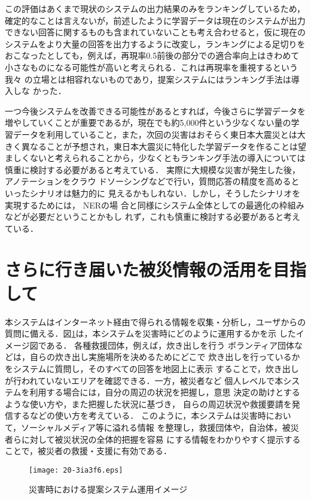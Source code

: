 \documentclass[japanese]{jnlp_1.4}
\begin{document}
この評価はあくまで現状のシステムの出力結果のみをランキングしているため，
確定的なことは言えないが，前述したように学習データは現在のシステムが出力
できない回答に関するものも含まれていないことも考え合わせると，仮に現在の
システムをより大量の回答を出力するように改変し，ランキングによる足切りを
おこなったとしても，例えば，再現率0.5前後の部分での適合率向上はきわめて
小さなものになる可能性が高いと考えられる．これは再現率を重視するという我々
の立場とは相容れないものであり，提案システムにはランキング手法は導入しな
かった．

一つ今後システムを改善できる可能性があるとすれば，今後さらに学習データを
増やしていくことが重要であるが，現在でも約5,000件という少なくない量の学
習データを利用していること，また，次回の災害はおそらく東日本大震災とは大
きく異なることが予想され，東日本大震災に特化した学習データを作ることは望
ましくないと考えられることから，少なくともランキング手法の導入については
慎重に検討する必要があると考えている．
実際に大規模な災害が発生した後，アノテーションをクラウ
ドソーシングなどで行い，質問応答の精度を高めるといったシナリオは魅力的に
見えるかもしれない．しかし，そうしたシナリオを実現するためには， NERの場
合と同様にシステム全体としての最適化の枠組みなどが必要だということかもし
れず，これも慎重に検討する必要があると考えている．


\section{さらに行き届いた被災情報の活用を目指して}
\label{Prospects}

本システムはインターネット経由で得られる情報を収集・分析し，ユーザからの質問に備える．図\ref{practicalimage}は，本システムを災害時にどのように運用するかを示
したイメージ図である．
各種救援団体，例えば，炊き出しを行う
ボランティア団体などは，自らの炊き出し実施場所を決めるためにどこで
炊き出しを行っているかをシステムに質問し，そのすべての回答を地図上に表示
することで，炊き出しが行われていないエリアを確認できる．一方，被災者など
個人レベルで本システムを利用する場合には，自分の周辺の状況を把握し，意思
決定の助けとするような使い方や，また把握した状況に基づき，
自らの周辺状況や救援要請を発信するなどの使い方を考えている．
このように，本システムは災害時において，ソーシャルメディア等に溢れる情報
を整理し，救援団体や，自治体，被災者らに対して被災状況の全体的把握を容易
にする情報をわかりやすく提示することで，被災者の救援・支援に有効である．

\begin{figure}[t]
\begin{center}
\texttt{[image: 20-3ia3f6.eps]}
\end{center}
\caption{災害時における提案システム運用イメージ}
\label{practicalimage}
\end{figure}
\end{document}
